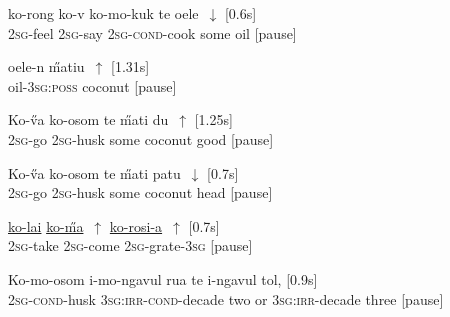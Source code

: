 \documentclass[output=paper]{LSP/langsci}
\begin{document}
 \begin{exe}
\ex \label{Guapp2}
\gll    ko-rong        ko-v       ko-mo-kuk           te      oele~$\downarrow$ [0.6s]\\     	       
\textsc{2sg}-feel     \textsc{2sg}-say   \textsc{2sg-cond}-cook   some    oil [pause]\\
\glt {} 
\end{exe}

  \begin{exe}
\ex \label{Guapp3}
\gll    oele-n          \H{m}atiu~$\uparrow$ [1.31s]\\     	       
 oil-\textsc{3sg:poss} coconut [pause]\\
\glt {} 
\end{exe}


  \begin{exe}
\ex \label{Guapp4}
\gll    Ko-\H{v}a        ko-osom         te      \H{m}ati        du~$\uparrow$ [1.25s]\\     	       
 \textsc{2sg}-go    \textsc{2sg}-husk      some    coconut   good [pause]\\
\glt {} 
\end{exe}


  \begin{exe}
\ex \label{Guapp5}
\gll    Ko-\H{v}a        ko-osom         te      \H{m}ati        patu~$\downarrow$ [0.7s]\\     	       
 \textsc{2sg}-go    \textsc{2sg}-husk      some    coconut   head [pause]\\
\glt {} 
\end{exe}

  \begin{exe}
\ex \label{Guapp6}
\gll    \underline{ko-lai}      \underline{ko-\H{m}a}~$\uparrow$       \underline{ko-rosi-a}~$\uparrow$ [0.7s]\\     	       
 \textsc{2sg}-take   \textsc{2sg}-come   \textsc{2sg}-grate-\textsc{3sg} [pause]\\
\glt {} 
\end{exe}


  \begin{exe}
\ex \label{Guapp7}
\gll    Ko-mo-osom       i-mo-ngavul                rua   te     i-ngavul    tol, [0.9s]\\     	       
 \textsc{2sg}-\textsc{cond}-husk   \textsc{3sg:irr-cond}-decade   two   or     \textsc{3sg:irr}-decade    three [pause]\\
\glt {} 
\end{exe}
\end{document}
